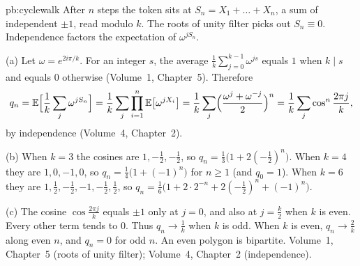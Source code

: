 \begin{solution}{pb:cyclewalk}
\idea After $n$ steps the token sits at $S_n=X_1+\dots+X_n$, a sum of independent $\pm1$, read modulo $k$. The roots of unity filter picks out
$S_n\equiv0$. Independence factors the expectation of $\omega^{jS_n}$.

\writeup (a) Let $\omega=e^{2i\pi/k}$. For an integer $s$, the average $\frac1k\sum_{j=0}^{k-1}\omega^{js}$ equals $1$ when $k\mid s$ and equals $0$
otherwise (Volume~1, Chapter~5). Therefore
\[
q_n=\mathbb E\Bigl[\frac1k\sum_j\omega^{jS_n}\Bigr]=\frac1k\sum_j\prod_{i=1}^n\mathbb E\bigl[\omega^{jX_i}\bigr]
=\frac1k\sum_j\Bigl(\frac{\omega^j+\omega^{-j}}2\Bigr)^n=\frac1k\sum_j\cos^n\frac{2\pi j}k,
\]
by independence (Volume~4, Chapter~2).

(b) When $k=3$ the cosines are $1,-\frac12,-\frac12$, so $q_n=\frac13\bigl(1+2(-\frac12)^n\bigr)$. When $k=4$ they are
$1,0,-1,0$, so $q_n=\frac14\bigl(1+(-1)^n\bigr)$ for $n\ge1$ (and $q_0=1$). When $k=6$ they are $1,\frac12,-\frac12,-1,-\frac12,
\frac12$, so $q_n=\frac16\bigl(1+2\cdot2^{-n}+2(-\frac12)^n+(-1)^n\bigr)$.

(c) The cosine $\cos\frac{2\pi j}k$ equals $\pm1$ only at $j=0$, and also at $j=\frac k2$ when $k$ is even. Every other term tends to $0$. Thus $q_n\to\frac1k$
when $k$ is odd. When $k$ is even, $q_n\to\frac2k$ along even $n$, and $q_n=0$ for odd $n$. An even polygon is bipartite.
\tools Volume~1, Chapter~5 (roots of unity filter); Volume~4, Chapter~2 (independence).
\end{solution}

